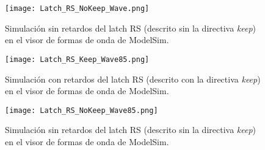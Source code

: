 \begin{figure}[ht]
	\centering
	\texttt{[image: Latch\_RS\_NoKeep\_Wave.png]}
	\caption{Simulación sin retardos del latch RS (descrito sin la directiva \textit{keep}) en el visor de formas de onda de ModelSim. \label{fig:Latch_RS_NoKeep_Wave}}
\end{figure}

\begin{figure}[ht]
	\centering
	\texttt{[image: Latch\_RS\_Keep\_Wave85.png]}
	\caption{Simulación con retardos del latch RS (descrito con la directiva \textit{keep}) en el visor de formas de onda de ModelSim. \label{fig:Latch_RS_Keep_Wave85}}
\end{figure}

\begin{figure}[ht]
	\centering
	\texttt{[image: Latch\_RS\_NoKeep\_Wave85.png]}
	\caption{Simulación sin retardos del latch RS (descrito sin la directiva \textit{keep}) en el visor de formas de onda de ModelSim. \label{fig:Latch_RS_NoKeep_Wave85}}
\end{figure}